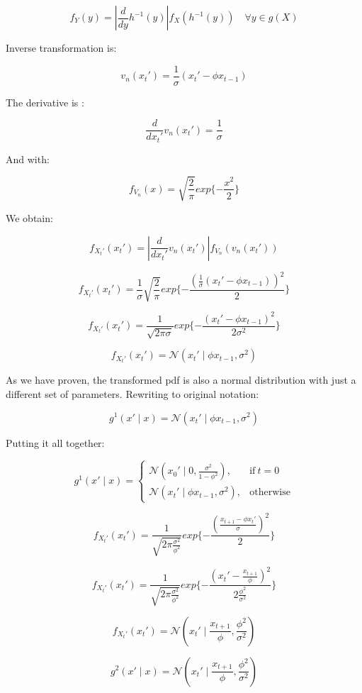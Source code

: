 \documentclass[]{article}
\begin{document}
	$$ f_Y(y) = \left | \frac{d}{dy} h^{-1}(y) \right | f_X(h^{-1}(y)) \quad \forall y \in g(X)$$
	
	Inverse transformation is:
	
	$$ v_n(x_t') = \frac{1}{\sigma} ( x_t' - \phi x_{t-1})$$
	
	The derivative is :
	
	$$ \frac{d}{d x_t'} v_n(x_t') = \frac{1}{\sigma} $$
	
	And with:
	
	$$  f_{V_n}( x ) = \sqrt{\frac{2}{\pi}} exp\{ -\frac{x^2}{2} \} $$
	
	We obtain:
	
	$$ f_{X_t'}(x_t') = \left | \frac{d}{dx_t'} v_n(x_t') \right | f_{V_n}(v_n(x_t')) $$
	
	$$ f_{X_t'}(x_t') = \frac{1}{\sigma} \sqrt{\frac{2}{\pi}} exp\{ -\frac{(\frac{1}{\sigma} ( x_t' - \phi x_{t-1}))^2}{2} \} $$
	
	$$ f_{X_t'}(x_t') = \frac{1}{\sqrt{2 \pi \sigma}} exp\{ -\frac{( x_t' - \phi x_{t-1})^2}{2 \sigma^2} \} $$
	
	$$ f_{X_t'}(x_t') = \mathcal{N}(x_t' \mid \phi x_{t-1}, \sigma^2) $$
	
	As we have proven, the transformed pdf is also a normal distribution with just a different set of parameters. Rewriting to original notation:
	
	$$ g^1(x' \mid x) = \mathcal{N}(x_t' \mid \phi x_{t-1}, \sigma^2) $$
	
	Putting it all together:
	
	\begin{equation}
	g^1(x' \mid x)=
	\begin{cases}
	\mathcal{N}(x_0' \mid 0, \frac{\sigma^2}{1-\phi^2}), & \text{if}\ t=0 \\
	\mathcal{N}(x_t' \mid \phi x_{t-1}, \sigma^2) , & \text{otherwise}
	\end{cases}
	\end{equation}
	
	$$ f_{X_t'}(x_t') =  \frac{1}{ \sqrt{2 \pi \frac{\sigma^2}{\phi^2} }} exp\{ -\frac{ (\frac{x_{t+1} - \phi x_t'}{\sigma})^2}{2} \}$$
	
	$$ f_{X_t'}(x_t') =  \frac{1}{ \sqrt{2 \pi \frac{\sigma^2}{\phi^2} }} exp\{ -\frac{ ( x_t' - \frac{x_{t+1}}{\phi} )^2}{2 \frac{\phi^2}{\sigma^2}} \}$$
	
	$$ f_{X_t'}(x_t') = \mathcal{N}(x_t' \mid \frac{x_{t+1}}{\phi}, \frac{\phi^2}{\sigma^2}) $$
	
	
	$$ g^2(x' \mid x) = \mathcal{N}(x_t' \mid \frac{x_{t+1}}{\phi}, \frac{\phi^2}{\sigma^2}) $$
	
\end{document}
